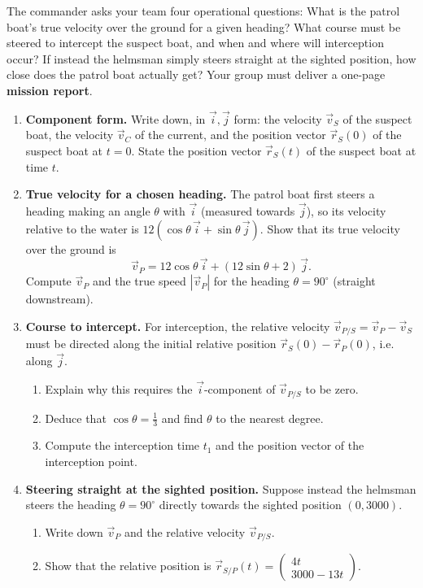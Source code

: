 \documentclass[11pt]{article}
\newcounter{popsec}
\newcounter{popsub}
\newcommand{\courssub}[1]{%
  \stepcounter{popsub}%
  \par\vspace{9pt}\noindent{\popxbold\fontsize{11.5}{13}\selectfont\color{popink}{\color{poporange}\thepopsec.\thepopsub}\hspace{6pt}#1}\par\nopagebreak\vspace{4pt}
}
\begin{document}
The commander asks your team four operational questions: What is the patrol boat's true velocity over the ground for a given heading? What course must be steered to intercept the suspect boat, and when and where will interception occur? If instead the helmsman simply steers straight at the sighted position, how close does the patrol boat actually get? Your group must deliver a one-page \textbf{mission report}.

\courssub{Tasks}

\begin{enumerate}
\item \textbf{Component form.} Write down, in $\vec{i},\vec{j}$ form: the velocity $\vec{v}_S$ of the suspect boat, the velocity $\vec{v}_C$ of the current, and the position vector $\vec{r}_S(0)$ of the suspect boat at $t=0$. State the position vector $\vec{r}_S(t)$ of the suspect boat at time $t$.
\item \textbf{True velocity for a chosen heading.} The patrol boat first steers a heading making an angle $\theta$ with $\vec{i}$ (measured towards $\vec{j}$), so its velocity relative to the water is $12(\cos\theta\,\vec{i}+\sin\theta\,\vec{j})$. Show that its true velocity over the ground is
\[\vec{v}_P=12\cos\theta\,\vec{i}+(12\sin\theta+2)\,\vec{j}.\]
Compute $\vec{v}_P$ and the true speed $|\vec{v}_P|$ for the heading $\theta=90^{\circ}$ (straight downstream).
\item \textbf{Course to intercept.} For interception, the relative velocity $\vec{v}_{P/S}=\vec{v}_P-\vec{v}_S$ must be directed along the initial relative position $\vec{r}_S(0)-\vec{r}_P(0)$, i.e. along $\vec{j}$.
\begin{enumerate}
\item Explain why this requires the $\vec{i}$-component of $\vec{v}_{P/S}$ to be zero.
\item Deduce that $\cos\theta=\tfrac{1}{3}$ and find $\theta$ to the nearest degree.
\item Compute the interception time $t_1$ and the position vector of the interception point.
\end{enumerate}
\item \textbf{Steering straight at the sighted position.} Suppose instead the helmsman steers the heading $\theta=90^{\circ}$ directly towards the sighted position $(0,3000)$.
\begin{enumerate}
\item Write down $\vec{v}_P$ and the relative velocity $\vec{v}_{P/S}$.
\item Show that the relative position is $\vec{r}_{S/P}(t)=\begin{pmatrix}4t\\3000-13t\end{pmatrix}$.

\end{enumerate}
\end{enumerate}
\end{document}
